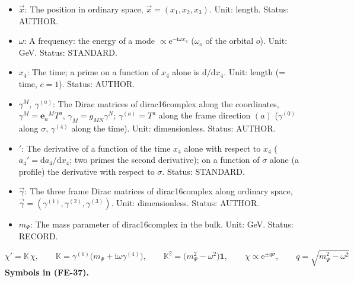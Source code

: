 \documentclass[
  10pt,
]{article}
\begin{document}
\begin{itemize}
\item
  \(\vec x\): The position in ordinary space,
  \(\vec x = (x_1, x_2, x_3)\). Unit: length. Status: AUTHOR.
\item
  \(\omega\): A frequency: the energy of a mode
  \(\propto \mathrm{e}^{-\mathrm{i}\omega x_4}\) (\(\omega_o\) of the
  orbital \(o\)). Unit: GeV. Status: STANDARD.
\item
  \(x_4\): The time; a prime on a function of \(x_4\) alone is
  \(\mathrm{d}/\mathrm{d}x_4\). Unit: length (= time, \(c = 1\)).
  Status: AUTHOR.
\item
  \(\gamma^M,\ \gamma^{(a)}\): The Dirac matrices of dirac16complex
  along the coordinates, \(\gamma^M = \mathbf{e}_a{}^MT^a\),
  \(\gamma_M = g_{MN}\gamma^N\); \(\gamma^{(a)} = T^a\) along the frame
  direction \((a)\) (\(\gamma^{(0)}\) along \(\sigma\), \(\gamma^{(4)}\)
  along the time). Unit: dimensionless. Status: AUTHOR.
\item
  \({}'\): The derivative of a function of the time \(x_4\) alone with
  respect to \(x_4\) (\(a_4' = \mathrm{d}a_4/\mathrm{d}x_4\); two primes
  the second derivative); on a function of \(\sigma\) alone (a profile)
  the derivative with respect to \(\sigma\). Status: STANDARD.
\item
  \(\vec\gamma\): The three frame Dirac matrices of dirac16complex along
  ordinary space,
  \(\vec\gamma = (\gamma^{(1)}, \gamma^{(2)}, \gamma^{(3)})\). Unit:
  dimensionless. Status: AUTHOR.
\item
  \(m_\Psi\): The mass parameter of dirac16complex in the bulk. Unit:
  GeV. Status: RECORD.
\end{itemize}

\[
\chi' = \mathbb{K}\,\chi,\qquad \mathbb{K} = \gamma^{(0)}\big(m_\Psi + \mathrm{i}\omega\gamma^{(4)}\big),\qquad
\mathbb{K}^2 = \big(m_\Psi^2 - \omega^2\big)\mathbf{1},\qquad \chi \propto \mathrm{e}^{\pm q\sigma},\qquad q = \sqrt{m_\Psi^2 - \omega^2} \tag{FE-37}
\] \textbf{Symbols in (FE-37).}
\end{document}
